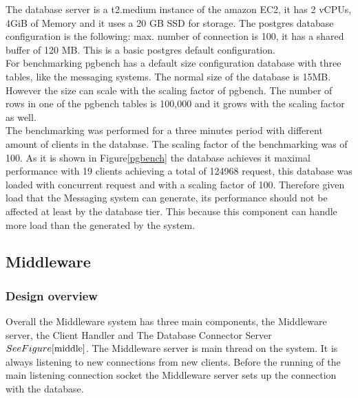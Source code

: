 The database server is a t2.medium instance of the amazon EC2, it has 2 vCPUs, 4GiB of Memory and it uses a 20 GB SSD for storage. The postgres database configuration is the following: max. number of connection is 100, it has a shared buffer of 120 MB. This is a basic postgres default configuration.\\	

For benchmarking pgbench has a default size configuration database with three tables, like the messaging systems. The normal size of the database is 15MB. However the size can scale with the scaling factor of pgbench. The number of rows in one of the pgbench tables is 100,000 and it grows with the scaling factor as well.\\

The benchmarking was performed for a three minutes period with different amount of clients in the database. The scaling factor of the benchmarking was of 100. 
As it is shown in Figure\ref{pgbench} the database achieves it maximal performance with 19 clients achieving a total of 124968 request, this database was loaded with concurrent request and with a scaling factor of 100. Therefore given load that the Messaging system can generate, its performance should not be affected at least by the database tier. This because this component can handle more load than the generated by the system.\\



\subsection{Middleware}\label{sec:middleware}

\subsubsection{Design overview}\label{sec:design-overview}
Overall the Middleware system has three main components, the Middleware server, the Client Handler and The Database Connector Server \( See Figure \ref{middle} \).
The Middleware server is main thread on the system. It is always listening to new connections from new clients. Before the running of the main listening connection socket the Middleware server sets up the connection with the database.\\

